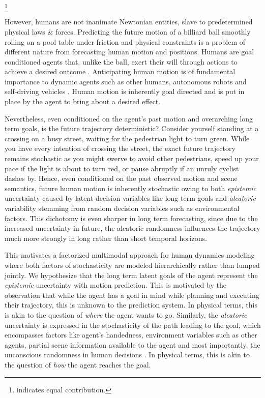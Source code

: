 \documentclass[final]{cvpr}
\newcommand\blfootnote[1]{\begingroup
  \renewcommand\thefootnote{}\footnote{#1}\addtocounter{footnote}{-1}\endgroup
}
\begin{document}
\blfootnote{ indicates equal contribution.}

However, humans are not inanimate Newtonian entities, slave to predetermined physical laws \& forces. Predicting the future motion of a billiard ball smoothly rolling on a pool table under friction and physical constraints is a problem of different nature from forecasting human motion and positions. Humans are goal conditioned agents that, unlike the ball, exert their will through actions to achieve a desired outcome \cite{tomasello2005understanding}. Anticipating human motion is of fundamental importance to dynamic agents such as other humans, autonomous robots \cite{bennewitz2002learning} and self-driving vehicles \cite{thrun2002probabilistic}. Human motion is inherently goal directed and is put in place by the agent to bring about a desired effect.  

Nevertheless, even conditioned on the agent's past motion and overarching long term goals, is the future trajectory deterministic? Consider yourself standing at a crossing on a busy street, waiting for the pedestrian light to turn green. While you have every intention of crossing the street, the exact future trajectory remains stochastic as you might swerve to avoid other pedestrians, speed up your pace if the light is about to turn red, or pause abruptly if an unruly cyclist dashes by. Hence, even conditioned on the past observed motion and scene semantics, future human motion is inherently stochastic \cite{helbing1993stochastische} owing to both \textit{epistemic} uncertainty caused by latent decision variables like long term goals and \textit{aleatoric} variability \cite{der2009aleatory} stemming from random decision variables such as environmental factors. This dichotomy is even sharper in long term forecasting, since due to the increased uncertainty in future, the aleatoric randomness influences the trajectory much more strongly in long rather than short temporal horizons. 

This motivates a factorized multimodal approach for human dynamics modeling where both factors of stochasticity are modeled hierarchically rather than lumped jointly. We hypothesize that the long term latent goals of the agent represent the \textit{epistemic} uncertainty with motion prediction. This is motivated by the observation that while the agent has a goal in mind while planning and executing their trajectory, this is unknown to the prediction system. In physical terms, this is akin to the question of \textit{where} the agent wants to go. Similarly, the \textit{aleatoric} uncertainty is expressed in the stochasticity of the path leading to the goal, which encompasses factors like agent's handedness, environment variables such as other agents, partial scene information available to the agent and most importantly, the unconscious randomness in human decisions \cite{kahneman2011thinking}. In physical terms, this is akin to the question of \textit{how} the agent reaches the goal.
\end{document}
